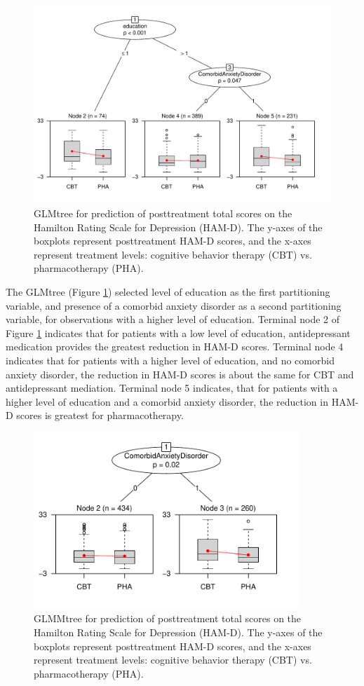 \documentclass[nobf,doc]{apa}
\begin{document}
\begin{figure}[!ht]
    \includegraphics[width=12cm]{app_lmtree.pdf}
	\caption{GLMtree for prediction of posttreatment total scores on the Hamilton Rating Scale for Depression (HAM-D). The y-axes of the boxplots represent posttreatment HAM-D scores, and the x-axes represent treatment levels: cognitive behavior therapy (CBT) vs. pharmacotherapy (PHA).}
	\label{fig:lmtree_C&W}
\end{figure}

The GLMtree (Figure \ref{fig:lmtree_C&W}) selected level of education as the first partitioning variable, and presence of a comorbid anxiety disorder as a second partitioning variable, for observations with a higher level of education. Terminal node 2 of Figure \ref{fig:lmtree_C&W} indicates that for patients with a low level of education, antidepressant medication provides the greatest reduction in HAM-D scores. Terminal node 4 indicates that for patients with a higher level of education, and no comorbid anxiety disorder, the reduction in HAM-D scores is about the same for CBT and antidepressant mediation. Terminal node 5 indicates, that for patients with a higher level of education and a comorbid anxiety disorder, the reduction in HAM-D scores is greatest for pharmacotherapy.


\begin{figure}[!ht]
    \includegraphics[width=10cm]{app_lmertree.pdf}
	\caption{GLMMtree for prediction of posttreatment total scores on the Hamilton Rating Scale for Depression (HAM-D). The y-axes of the boxplots represent posttreatment HAM-D scores, and the x-axes represent treatment levels: cognitive behavior therapy (CBT) vs. pharmacotherapy (PHA).}
	\label{fig:lmertree_C&W}
\end{figure}
\end{document}
